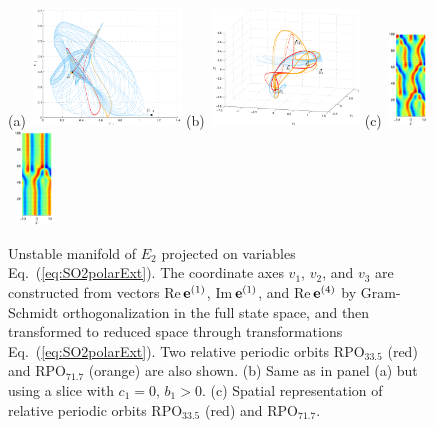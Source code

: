 \documentclass[aip,cha,showpacs,reprint]{revtex4-1} %
\newcommand{\refeq}  [1] {Eq.~(\ref{#1})}                   %
\newcommand{\jEigvec}[1][]{\ensuremath{{\bf e}^{(#1)}}} %
\newcommand{\rpo}{rela\-ti\-ve periodic orbit}
\newcommand{\EQV}[1]{\ensuremath{E_{#1}}}
\newcommand{\RPO}[1]{\ensuremath{\mathrm{RPO}_{#1}}}
\begin{document}
\begin{figure}[ht]
 \begin{center}
  (a)~\includegraphics[width=0.35\textwidth]{ks22_E2_manif_homo_rpo_inv}
  (b)~\includegraphics[width=0.35\textwidth]{ks22_E2_manif_homo_rpo_mf1}
  (c)~\includegraphics[width=0.09\textwidth, clip=true]{ks22rpo0335-0505}
     ~\includegraphics[width=0.09\textwidth, clip=true]{ks22rpo0717-0550}
 \end{center}
  \caption{
Unstable manifold of \EQV{2} projected on variables
\refeq{eq:SO2polarExt}. The coordinate axes $v_1$, $v_2$, and $v_3$ are
constructed from vectors Re\,$\jEigvec[1]$, Im\,$\jEigvec[1]$, and
Re\,$\jEigvec[4]$ by Gram-Schmidt orthogonalization in the full state
space, and then transformed to reduced space through transformations
\refeq{eq:SO2polarExt}. Two relative periodic orbits $\RPO{33.5}$ (red)
and $\RPO{71.7}$ (orange) are also shown. (b) Same as in panel (a) but
using a slice with $c_1=0,\, b_1>0$. (c) Spatial representation of \rpo s
$\RPO{33.5}$ (red) and $\RPO{71.7}$.
  }
\label{f:ks22_E2_manif_rpo_homo}
\end{figure}
\end{document}

